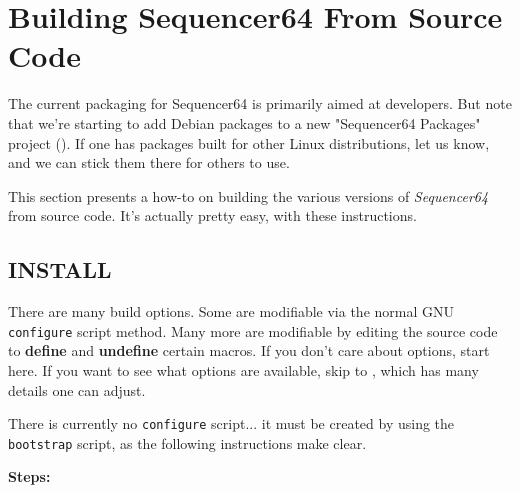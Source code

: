 %
%
%

\section{Building Sequencer64 From Source Code}
\label{sec:seq64_build}

   The current packaging for Sequencer64 is primarily aimed at developers.
   But note that we're starting to add Debian packages to a new "Sequencer64
   Packages" project (\cite{sequencer64packages}).  If one has packages
   built for other Linux distributions, let us know, and we can stick them
   there for others to use.

   This section presents a how-to on building the various versions of
   \textsl{Sequencer64} from source code.  It's actually pretty easy, with
   these instructions.

\subsection{INSTALL}
\label{subsec:seq64_build_install}

   There are many build options.  Some are modifiable via the normal GNU
   \texttt{configure} script method.  Many more are modifiable by
   editing the source code to \textbf{define} and \textbf{undefine} certain
   macros.  If you don't care about options, start here.  If you want to
   see what options are available, skip to
   , which has many details one can
   adjust.

   There is currently no \texttt{configure} script... it must be created
   by using the \texttt{bootstrap} script, as the following instructions make
   clear.

   \textbf{Steps:}

